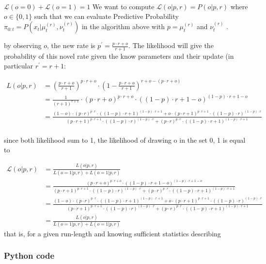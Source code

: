 \documentclass[12pt,english]{article}%
\newcommand{\eqs}[1]{\begin{align*}#1\end{align*}}
\newcommand{\Ll}{\mathcal{L}}
\begin{document}
$\Ll(o=0)+\Ll(o=1)=1$
We want to compute $\Ll(o| p, r) = P(o | p, r)$ where $o \in \{ 0, 1 \}$ such that we can evaluate Predictive Probability $\pi_{0:t} = P(x_t |\mu^{(r)}_t,\nu^{(r)}_t)$ in the algorithm above with $p=\mu^{(r)}_t$ and $\nu^{(r)}_t$ .

by observing $o$, the new rate is $p^{'} = \frac{p\cdot r + o}{r+1}$.
The likelihood will give the probability of this novel rate given the know parameters and their update (in particular $r^{'}=r+1$:


\eqs{
L(o | p, r)&={(\frac{p\cdot r + o}{r+1})}^{p\cdot r + o} \cdot (1-\frac{p\cdot r + o}{r+1})^{r + o - (p\cdot r + o)} \\
&= \frac{1}{({r+1})^{r+1}} \cdot {(p\cdot r + o)}^{p\cdot r + o}  \cdot {((1- p)\cdot r + 1- o)}^{(1- p)\cdot r + 1- o} \\
&= \frac{ (1-o) \cdot {(p\cdot r)}^{p\cdot r}  \cdot {((1- p)\cdot r + 1)}^{(1- p)\cdot r + 1}
+ o \cdot {(p\cdot r + 1)}^{p\cdot r + 1}  \cdot {((1- p)\cdot r)}^{(1- p)\cdot r}
 }{
 {(p\cdot r + 1)}^{p\cdot r + 1}  \cdot {((1- p)\cdot r )}^{(1- p)\cdot r }  +
  {(p\cdot r )}^{p\cdot r }  \cdot {((1- p)\cdot r + 1)}^{(1- p)\cdot r + 1}
}  \\
}

    since both likelihood sum to 1, the likelihood of drawing o in the set {0, 1}
    is equal to

\eqs{
\Ll(o | p, r)&=\frac{L(o | p, r)}{L(o=1 | p, r) + L(o=1 | p, r)}  \\
&= \frac{ {(p\cdot r + o)}^{p\cdot r + o}  \cdot {((1- p)\cdot r + 1- o)}^{(1- p)\cdot r + 1- o} }{
 {(p\cdot r + 1)}^{p\cdot r + 1}  \cdot {((1- p)\cdot r )}^{(1- p)\cdot r }  +
  {(p\cdot r )}^{p\cdot r }  \cdot {((1- p)\cdot r + 1)}^{(1- p)\cdot r + 1}
}  \\
&= \frac{ (1-o) \cdot {(p\cdot r)}^{p\cdot r}  \cdot {((1- p)\cdot r + 1)}^{(1- p)\cdot r + 1}
+ o \cdot {(p\cdot r + 1)}^{p\cdot r + 1}  \cdot {((1- p)\cdot r)}^{(1- p)\cdot r}
 }{
 {(p\cdot r + 1)}^{p\cdot r + 1}  \cdot {((1- p)\cdot r )}^{(1- p)\cdot r }  +
  {(p\cdot r )}^{p\cdot r }  \cdot {((1- p)\cdot r + 1)}^{(1- p)\cdot r + 1}
}  \\
&=  \frac{L(o | p, r)}{L(o=1 | p, r) + L(o=1 | p, r)}
}
that is, for a given run-length and knowing sufficient statistics describing

\subsubsection{Python code}
\end{document}
